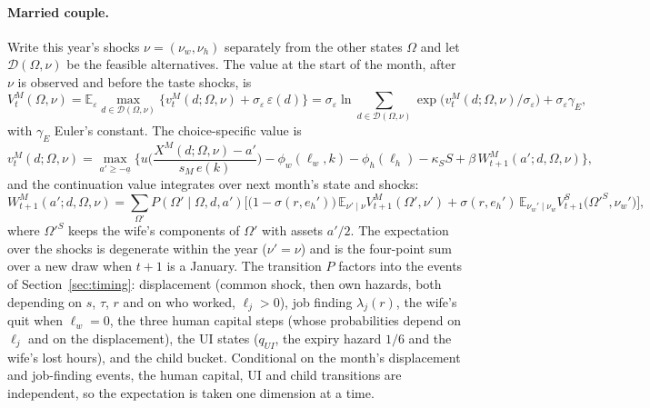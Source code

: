 \documentclass[11pt]{article}
\newcommand{\E}{\mathbb{E}}
\newcommand{\1}{\mathbf{1}}
\begin{document}
\paragraph{Married couple.} Write this year's shocks $\nu = (\nu_w, \nu_h)$ separately from the other states $\Omega$
and let $\mathcal D(\Omega, \nu)$ be the feasible alternatives. The value at the start of the month, after $\nu$ is
observed and before the taste shocks, is
\begin{equation}\label{eq:VM}
  V^M_t(\Omega, \nu) = \E_\varepsilon \max_{d \in \mathcal D(\Omega,\nu)} \big\{ v^M_t(d; \Omega, \nu) + \sigma_\varepsilon\,\varepsilon(d) \big\}
  = \sigma_\varepsilon \ln \sum_{d \in \mathcal D(\Omega,\nu)} \exp\!\big(v^M_t(d; \Omega, \nu)/\sigma_\varepsilon\big) + \sigma_\varepsilon\gamma_E ,
\end{equation}
with $\gamma_E$ Euler's constant. The choice-specific value is
\begin{equation}\label{eq:vM}
  v^M_t(d; \Omega, \nu) = \max_{a' \ge -\underline a} \Big\{ u\!\Big(\frac{X^M(d; \Omega, \nu) - a'}{s_M\, e(k)}\Big)
     - \phi_w(\ell_w, k) - \phi_h(\ell_h) - \kappa_S S + \beta\, W^M_{t+1}(a'; d, \Omega, \nu) \Big\},
\end{equation}
and the continuation value integrates over next month's state and shocks:
\begin{equation}\label{eq:WM}
  W^M_{t+1}(a'; d, \Omega, \nu) = \sum_{\Omega'} P(\Omega' \mid \Omega, d, a')
   \Big[ \big(1 - \sigma(r, e_h')\big)\, \E_{\nu' \mid \nu} V^M_{t+1}(\Omega', \nu')
         + \sigma(r, e_h')\, \E_{\nu_w' \mid \nu_w} V^S_{t+1}\big(\Omega'^S, \nu_w'\big) \Big],
\end{equation}
where $\Omega'^S$ keeps the wife's components of $\Omega'$ with assets $a'/2$. The expectation over the shocks is degenerate within the year
($\nu' = \nu$) and is the four-point sum over a new draw when $t+1$ is a January. The transition $P$ factors into the
events of Section~\ref{sec:timing}: displacement (common shock, then own hazards, both depending on $s$, $\tau$, $r$ and
on who worked, $\ell_j > 0$), job finding $\lambda_j(r)$, the wife's quit when $\ell_w = 0$, the three human capital
steps (whose probabilities depend on $\ell_j$ and on the displacement), the UI states ($q_{UI}$, the expiry hazard $1/6$
and the wife's lost hours), and the child bucket. Conditional on the month's displacement and job-finding events, the
human capital, UI and child transitions are independent, so the expectation is taken one dimension at a time.
\end{document}
